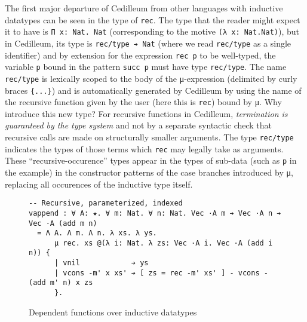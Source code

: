 \documentclass{article}
\newcommand{\vars}[1]{{\overline{#1}}}
\begin{document}
The first major departure of Cedilleum from other languages with inductive
datatypes can be seen in the type of \texttt{rec}. The type that the reader
might expect it to have is \verb;Π x: Nat. Nat; (corresponding to the motive
\verb;(λ x: Nat.Nat);), but in Cedilleum, its type is \verb;rec/type ➔ Nat;
(where we read \texttt{rec/type} as a single identifier) and by extension for
the expression \texttt{rec p} to be well-typed, the variable \texttt{p} bound in
the pattern \texttt{succ p} must have type \texttt{rec/type}. The name
\texttt{rec/type} is lexically scoped to the body of the μ-expression (delimited
by curly braces \texttt{\{...\}}) and is
automatically generated by Cedilleum by using the name of the recursive
function given by the user (here this is \texttt{rec}) bound by μ. Why introduce this new type? For recursive
functions in Cedilleum, \textit{termination is guaranteed by the type system}
and not by a separate syntactic check that recursive calls are made on
structurally smaller arguments. The type \texttt{rec/type} indicates the types
of those terms which \texttt{rec} may legally take as arguments. These
``recursive-occurence'' types appear in the types of sub-data (such
as \texttt{p} in the example) in the constructor patterns of the case branches
introduced by μ, replacing all
occurences of the inductive type itself.


\begin{figure}[h]
\begin{verbatim}
-- Recursive, parameterized, indexed
vappend : ∀ A: ★. ∀ m: Nat. ∀ n: Nat. Vec ·A m ➔ Vec ·A n ➔ Vec ·A (add m n)
  = Λ A. Λ m. Λ n. λ xs. λ ys.
      μ rec. xs @(λ i: Nat. λ zs: Vec ·A i. Vec ·A (add i n)) {
      | vnil            ➔ ys
      | vcons -m' x xs' ➔ [ zs = rec -m' xs' ] - vcons -(add m' n) x zs
      }.
\end{verbatim}
  \caption{Dependent functions over inductive datatypes}
  \label{fig:ex-data-dep}
\end{figure}
\end{document}
